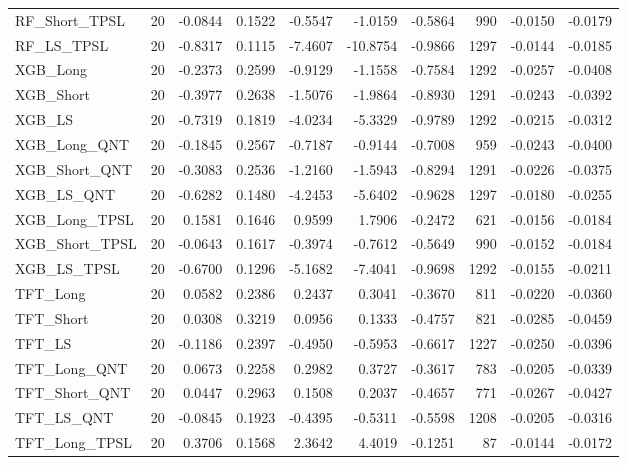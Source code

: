 \begin{tabular}{llrrrrrrrr}
\cline{1-10}
RF\_Short\_TPSL & 20 & -0.0844 & 0.1522 & -0.5547 & -1.0159 & -0.5864 & 990 & -0.0150 & -0.0179 \\
\cline{1-10}
RF\_LS\_TPSL & 20 & -0.8317 & 0.1115 & -7.4607 & -10.8754 & -0.9866 & 1297 & -0.0144 & -0.0185 \\
\cline{1-10}
XGB\_Long & 20 & -0.2373 & 0.2599 & -0.9129 & -1.1558 & -0.7584 & 1292 & -0.0257 & -0.0408 \\
\cline{1-10}
XGB\_Short & 20 & -0.3977 & 0.2638 & -1.5076 & -1.9864 & -0.8930 & 1291 & -0.0243 & -0.0392 \\
\cline{1-10}
XGB\_LS & 20 & -0.7319 & 0.1819 & -4.0234 & -5.3329 & -0.9789 & 1292 & -0.0215 & -0.0312 \\
\cline{1-10}
XGB\_Long\_QNT & 20 & -0.1845 & 0.2567 & -0.7187 & -0.9144 & -0.7008 & 959 & -0.0243 & -0.0400 \\
\cline{1-10}
XGB\_Short\_QNT & 20 & -0.3083 & 0.2536 & -1.2160 & -1.5943 & -0.8294 & 1291 & -0.0226 & -0.0375 \\
\cline{1-10}
XGB\_LS\_QNT & 20 & -0.6282 & 0.1480 & -4.2453 & -5.6402 & -0.9628 & 1297 & -0.0180 & -0.0255 \\
\cline{1-10}
XGB\_Long\_TPSL & 20 & 0.1581 & 0.1646 & 0.9599 & 1.7906 & -0.2472 & 621 & -0.0156 & -0.0184 \\
\cline{1-10}
XGB\_Short\_TPSL & 20 & -0.0643 & 0.1617 & -0.3974 & -0.7612 & -0.5649 & 990 & -0.0152 & -0.0184 \\
\cline{1-10}
XGB\_LS\_TPSL & 20 & -0.6700 & 0.1296 & -5.1682 & -7.4041 & -0.9698 & 1292 & -0.0155 & -0.0211 \\
\cline{1-10}
TFT\_Long & 20 & 0.0582 & 0.2386 & 0.2437 & 0.3041 & -0.3670 & 811 & -0.0220 & -0.0360 \\
\cline{1-10}
TFT\_Short & 20 & 0.0308 & 0.3219 & 0.0956 & 0.1333 & -0.4757 & 821 & -0.0285 & -0.0459 \\
\cline{1-10}
TFT\_LS & 20 & -0.1186 & 0.2397 & -0.4950 & -0.5953 & -0.6617 & 1227 & -0.0250 & -0.0396 \\
\cline{1-10}
TFT\_Long\_QNT & 20 & 0.0673 & 0.2258 & 0.2982 & 0.3727 & -0.3617 & 783 & -0.0205 & -0.0339 \\
\cline{1-10}
TFT\_Short\_QNT & 20 & 0.0447 & 0.2963 & 0.1508 & 0.2037 & -0.4657 & 771 & -0.0267 & -0.0427 \\
\cline{1-10}
TFT\_LS\_QNT & 20 & -0.0845 & 0.1923 & -0.4395 & -0.5311 & -0.5598 & 1208 & -0.0205 & -0.0316 \\
\cline{1-10}
TFT\_Long\_TPSL & 20 & 0.3706 & 0.1568 & 2.3642 & 4.4019 & -0.1251 & 87 & -0.0144 & -0.0172 \\

\end{tabular}
